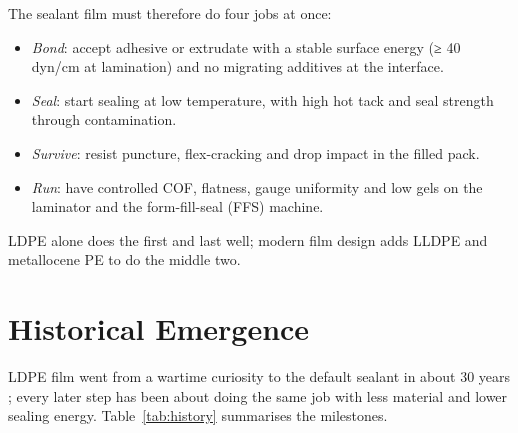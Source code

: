 \documentclass[10pt,twocolumn,a4paper]{article}
\begin{document}
The sealant film must therefore do four jobs at once:
\begin{itemize}\setlength\itemsep{1pt}
\item \textit{Bond}: accept adhesive or extrudate with a stable surface energy (≥ 40 dyn/cm at lamination) and no migrating additives at the interface.
\item \textit{Seal}: start sealing at low temperature, with high hot tack and seal strength through contamination.
\item \textit{Survive}: resist puncture, flex-cracking and drop impact in the filled pack.
\item \textit{Run}: have controlled COF, flatness, gauge uniformity and low gels on the laminator and the form-fill-seal (FFS) machine.
\end{itemize}
LDPE alone does the first and last well; modern film design adds LLDPE and metallocene PE to do the middle two.

\section{Historical Emergence}

LDPE film went from a wartime curiosity to the default sealant in about 30 years \cite{fawcett,cantor}; every later step has been about doing the same job with less material and lower sealing energy. Table~\ref{tab:history} summarises the milestones.
\end{document}
